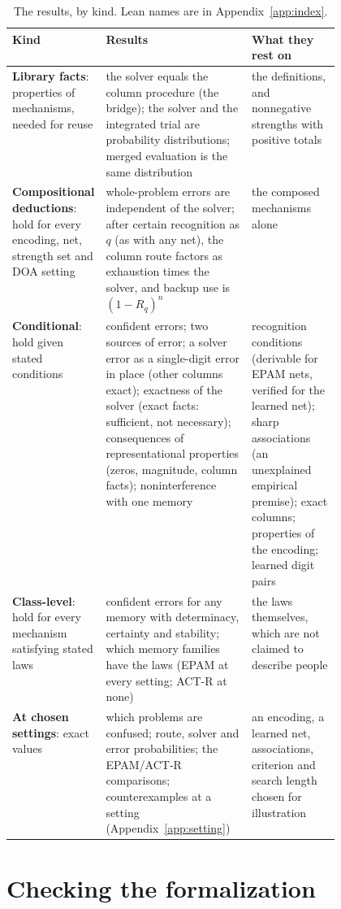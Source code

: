 \documentclass[11pt]{article}
\begin{document}
\begin{table}[t]
\centering
\small
\begin{tabularx}{\linewidth}{@{}p{0.2\linewidth}Xp{0.27\linewidth}@{}}
\toprule
Kind & Results & What they rest on \\
\midrule
\textbf{Library facts}: properties of mechanisms, needed for reuse & the solver equals the column procedure (the bridge); the solver and the integrated trial are probability distributions; merged evaluation is the same distribution & the definitions, and nonnegative strengths with positive totals \\
\addlinespace
\textbf{Compositional deductions}: hold for every encoding, net, strength set and DOA setting & whole-problem errors are independent of the solver; after certain recognition as $q$ (as with any net), the column route factors as exhaustion times the solver, and backup use is $(1-R_q)^n$ & the composed mechanisms alone \\
\addlinespace
\textbf{Conditional}: hold given stated conditions & confident errors; two sources of error; a solver error as a single-digit error in place (other columns exact); exactness of the solver (exact facts: sufficient, not necessary); consequences of representational properties (zeros, magnitude, column facts); noninterference with one memory & recognition conditions (derivable for EPAM nets, verified for the learned net); sharp associations (an unexplained empirical premise); exact columns; properties of the encoding; learned digit pairs \\
\addlinespace
\textbf{Class-level}: hold for every mechanism satisfying stated laws & confident errors for any memory with determinacy, certainty and stability; which memory families have the laws (EPAM at every setting; ACT-R at none) & the laws themselves, which are not claimed to describe people \\
\addlinespace
\textbf{At chosen settings}: exact values & which problems are confused; route, solver and error probabilities; the EPAM/ACT-R comparisons; counterexamples at a setting (Appendix~\ref{app:setting}) & an encoding, a learned net, associations, criterion and search length chosen for illustration \\
\bottomrule
\end{tabularx}
\caption{The results, by kind. Lean names are in Appendix~\ref{app:index}.}
\label{tab:kinds}
\end{table}

\section{Checking the formalization}
\label{sec:sim}
\end{document}
